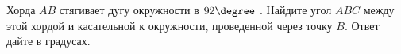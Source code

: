 \begin{ex}
	\begin{condition}
		Хорда \( AB \)  стягивает дугу окружности в \( 92\degree\) . Найдите угол \( ABC \)  между этой хордой и касательной к окружности, проведенной через точку \( B \). Ответ дайте в градусах.
	\end{condition}
\end{ex}